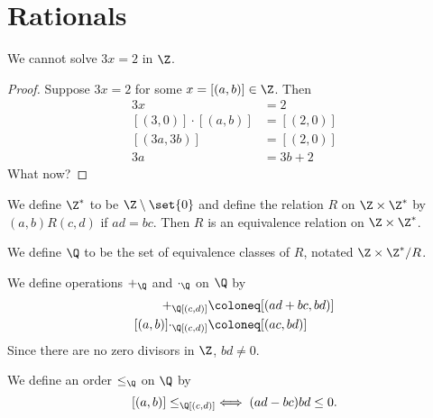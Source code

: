 \section{Rationals} \label{sec:rationals}
We cannot solve $3x = 2$ in $\Z$.
\begin{proof}
    Suppose $3x = 2$ for some $x = [(a, b)] \in \Z$.
    Then \begin{align*}
        3x &= 2 \\
        [(3, 0)] \cdot [(a, b)] &= [(2, 0)] \\
        [(3a, 3b)] &= [(2, 0)] \\
        3a &= 3b + 2
    \end{align*}
    What now?
\end{proof}
We define $\Z^*$ to be $\Z \setminus \set{0}$ and define the relation $R$ on
$\Z \times \Z^*$ by $(a, b) R (c, d)$ if $ad = bc$.
Then $R$ is an equivalence relation on $\Z \times \Z^*$.

\begin{definition}
    We define $\Q$ to be the set of equivalence classes of $R$, notated
    $\Z \times \Z^* / R$.
\end{definition}
We define operations $+_\Q$ and $\cdot_\Q$ on $\Q$ by
\begin{align*}
    [(a, b)] +_\Q [(c, d)] &\coloneq [(ad + bc, bd)] \\
    [(a, b)] \cdot_\Q [(c, d)] &\coloneq [(ac, bd)]
\end{align*}
Since there are no zero divisors in $\Z$, $bd \neq 0$.

We define an order $\leq_\Q$ on $\Q$ by \[
    [(a, b)] \leq_\Q [(c, d)] \iff (ad - bc) bd \leq 0.
\]
